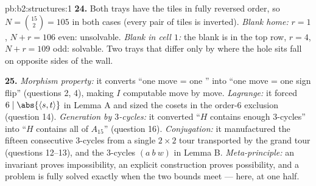 \begin{solution}{pb:b2:structures:1}
\textbf{24.} Both trays have the tiles in fully reversed order,
so $N = \binom{15}{2} = 105$ in both cases (every pair of tiles
is inverted). \emph{Blank home:} $r = 1$, $N + r = 106$ even:
unsolvable. \emph{Blank in cell $1$:} the blank is in the top
row, $r = 4$, $N + r = 109$ odd: solvable. Two trays that differ
only by where the hole sits fall on opposite sides of the wall.

\textbf{25.} \emph{Morphism property:} it converts ``one move =
one '' into ``one move = one sign flip'' (questions
2, 4), making $I$ computable move by move. \emph{Lagrange:} it
forced $6 \mid \abs{\langle s, t\rangle}$ in Lemma A and sized
the cosets in the order-$6$ exclusion (question 14).
\emph{Generation by $3$-cycles:} it converted ``$H$ contains
enough $3$-cycles'' into ``$H$ contains all of $A_{15}$''
(question 16). \emph{Conjugation:} it manufactured the fifteen
consecutive $3$-cycles from a single $2 \times 2$ tour
transported by the grand tour (questions 12--13), and the
$3$-cycles $(a\ b\ w)$ in Lemma B. \emph{Meta-principle:} an
invariant proves impossibility, an explicit construction proves
possibility, and a problem is fully solved exactly when the two
bounds meet --- here, at one half.
\end{solution}
